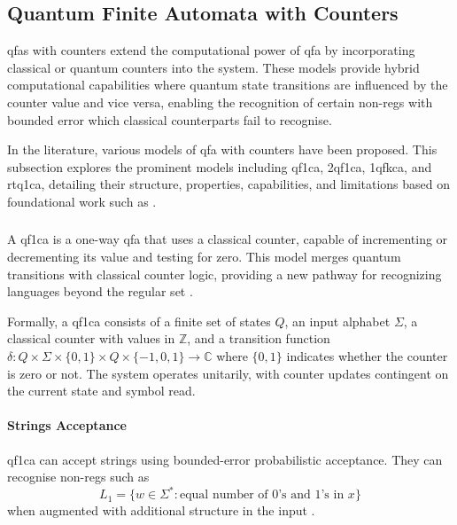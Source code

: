 \subsection{Quantum Finite Automata with Counters}
\label{sec:qfa-with-counters}

\glspl{qfa} with counters extend the computational power of \gls{qfa} by incorporating classical or quantum counters into the system. These models provide hybrid computational capabilities where quantum state transitions are influenced by the counter value and vice versa, enabling the recognition of certain non-\glspl{reg} with bounded error which classical counterparts fail to recognise.

In the literature, various models of \gls{qfa} with counters have been proposed. This subsection explores the prominent models including \gls{qf1ca}, \gls{2qf1ca}, \gls{1qfkca}, and \gls{rtq1ca}, detailing their structure, properties, capabilities, and limitations based on foundational work such as \cite{bonner2001quantum, kravtsev1999quantum, pani2011empowering, cem2012quantum}.

\subsubsection{}

A \gls{qf1ca} is a one-way \gls{qfa} that uses a classical counter, capable of incrementing or decrementing its value and testing for zero. This model merges quantum transitions with classical counter logic, providing a new pathway for recognizing languages beyond the regular set \cite{kravtsev1999quantum}.

\begin{definition}[\gls{qf1ca}]
Formally, a \gls{qf1ca} consists of a finite set of states $Q$, an input alphabet $\Sigma$, a classical counter with values in $\mathbb{Z}$, and a transition function $\delta: Q \times \Sigma \times \{0,1\} \times Q \times \{-1,0,1\} \rightarrow \mathbb{C}$ where $\{0,1\}$ indicates whether the counter is zero or not. The system operates unitarily, with counter updates contingent on the current state and symbol read.
\end{definition}

\paragraph{Strings Acceptance} 
\gls{qf1ca} can accept strings using bounded-error probabilistic acceptance. They can recognise non-\glspl{reg} such as \[L_1 = \{ w \in \Sigma^* : \text{equal number of 0's and 1's in } x \}\] when augmented with additional structure in the input \cite{bonner2001quantum}.

